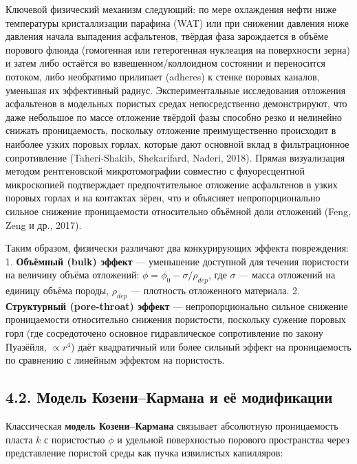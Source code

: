 \documentclass[11pt]{extarticle}
\begin{document}
Ключевой физический механизм следующий: по мере охлаждения нефти ниже температуры кристаллизации парафина (WAT) или при снижении давления ниже давления начала выпадения асфальтенов, твёрдая фаза зарождается в объёме порового флюида (гомогенная или гетерогенная нуклеация на поверхности зерна) и затем либо остаётся во взвешенном/коллоидном состоянии и переносится потоком, либо необратимо прилипает (adheres) к стенке поровых каналов, уменьшая их эффективный радиус. Экспериментальные исследования отложения асфальтенов в модельных пористых средах непосредственно демонстрируют, что даже небольшое по массе отложение твёрдой фазы способно резко и нелинейно снижать проницаемость, поскольку отложение преимущественно происходит в наиболее узких поровых горлах, которые дают основной вклад в фильтрационное сопротивление (Taheri-Shakib, Shekarifard, Naderi, 2018). Прямая визуализация методом рентгеновской микротомографии совместно с флуоресцентной микроскопией подтверждает предпочтительное отложение асфальтенов в узких поровых горлах и на контактах зёрен, что и объясняет непропорционально сильное снижение проницаемости относительно объёмной доли отложений (Feng, Zeng и др., 2017).

Таким образом, физически различают два конкурирующих эффекта повреждения:
1. \textbf{Объёмный (bulk) эффект} --- уменьшение доступной для течения пористости на величину объёма отложений: \(\phi = \phi_0 - \sigma/\rho_{dep}\), где \(\sigma\) --- масса отложений на единицу объёма породы, \(\rho_{dep}\) --- плотность отложенного материала.
2. \textbf{Структурный (pore-throat) эффект} --- непропорционально сильное снижение проницаемости относительно снижения пористости, поскольку сужение поровых горл (где сосредоточено основное гидравлическое сопротивление по закону Пуазёйля, \(\propto r^4\)) даёт квадратичный или более сильный эффект на проницаемость по сравнению с линейным эффектом на пористость.

\subsection{4.2. Модель Козени--Кармана и её модификации}\label{ux43cux43eux434ux435ux43bux44c-ux43aux43eux437ux435ux43dux438ux43aux430ux440ux43cux430ux43dux430-ux438-ux435ux451-ux43cux43eux434ux438ux444ux438ux43aux430ux446ux438ux438}

Классическая \textbf{модель Козени--Кармана} связывает абсолютную проницаемость пласта \(k\) с пористостью \(\phi\) и удельной поверхностью порового пространства через представление пористой среды как пучка извилистых капилляров:
\end{document}
